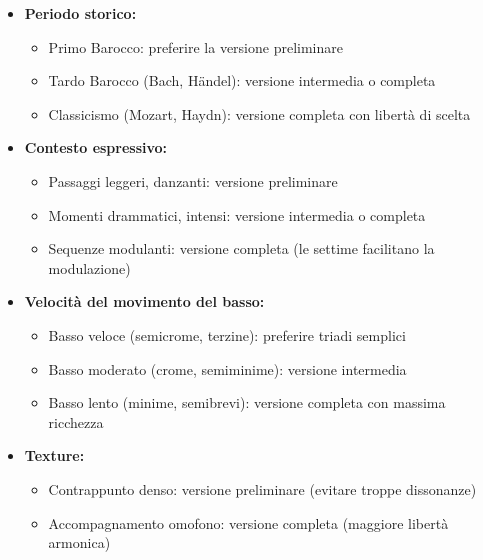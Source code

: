 \begin{regola}
	\label{reg:criteri_scelta_versioni}
	
	\begin{itemize}
		\item \textbf{Periodo storico:}
		\begin{itemize}
			\item Primo Barocco: preferire la versione preliminare
			\item Tardo Barocco (Bach, Händel): versione intermedia o completa
			\item Classicismo (Mozart, Haydn): versione completa con libertà di scelta
		\end{itemize}
		
		\item \textbf{Contesto espressivo:}
		\begin{itemize}
			\item Passaggi leggeri, danzanti: versione preliminare
			\item Momenti drammatici, intensi: versione intermedia o completa
			\item Sequenze modulanti: versione completa (le settime facilitano la modulazione)
		\end{itemize}
		
		\item \textbf{Velocità del movimento del basso:}
		\begin{itemize}
			\item Basso veloce (semicrome, terzine): preferire triadi semplici
			\item Basso moderato (crome, semiminime): versione intermedia
			\item Basso lento (minime, semibrevi): versione completa con massima ricchezza
		\end{itemize}
		
		\item \textbf{Texture:}
		\begin{itemize}
			\item Contrappunto denso: versione preliminare (evitare troppe dissonanze)
			\item Accompagnamento omofono: versione completa (maggiore libertà armonica)
		\end{itemize}
	\end{itemize}
\end{regola}

